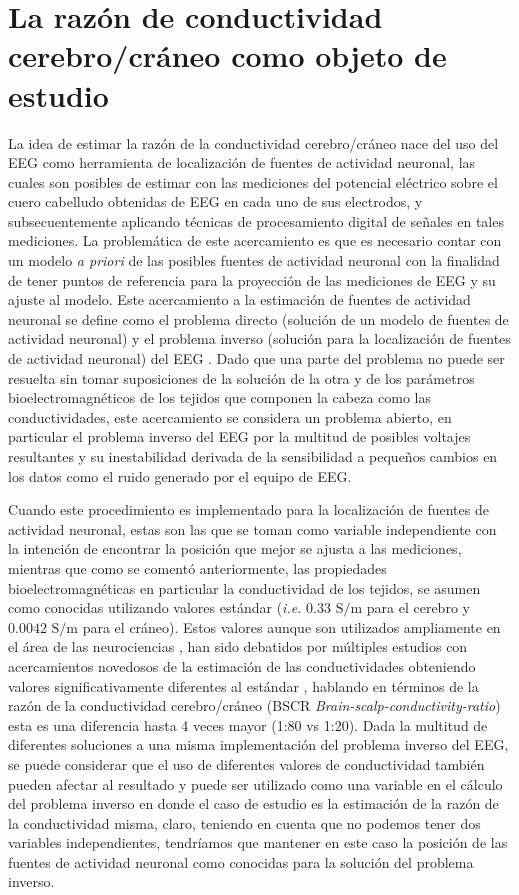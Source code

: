 \section{La razón de conductividad cerebro/cráneo como objeto de estudio}
\label{sec:intro:study}

La idea de estimar la razón de la conductividad cerebro/cráneo nace del uso del EEG como herramienta de localización de fuentes de actividad neuronal, las cuales son posibles de estimar con las mediciones del potencial eléctrico sobre el cuero cabelludo obtenidas de EEG en cada uno de sus electrodos, y subsecuentemente aplicando técnicas de procesamiento digital de señales en tales mediciones. La problemática de este acercamiento es que es necesario contar con un modelo \emph{a priori} de las posibles fuentes de actividad neuronal con la finalidad de tener puntos de referencia para la proyección de las mediciones de EEG y su ajuste al modelo. Este acercamiento a la estimación de fuentes de actividad neuronal se define como el problema directo (solución de un modelo de fuentes de actividad neuronal) y el problema inverso (solución para la localización de fuentes de actividad neuronal) del EEG \cite{Hallez2007}. Dado que una parte del problema no puede ser resuelta sin tomar suposiciones de la solución de la otra y de los parámetros bioelectromagnéticos de los tejidos que componen la cabeza como las conductividades, este acercamiento se considera un problema abierto, en particular el problema inverso del EEG por la multitud de posibles voltajes resultantes y su inestabilidad derivada de la sensibilidad a pequeños cambios en los datos como el ruido generado por el equipo de EEG. 

Cuando este procedimiento es implementado para la localización de fuentes de actividad neuronal, estas son las que se toman como variable independiente con la intención de encontrar la posición que mejor se ajusta a las mediciones, mientras que como se comentó anteriormente, las propiedades bioelectromagnéticas en particular la conductividad de los tejidos, se asumen como conocidas utilizando valores estándar (\emph{i.e.} $0.33\text{ S/m}$ para el cerebro y $0.0042 \text{ S/m}$ para el cráneo). Estos valores aunque son utilizados ampliamente en el área de las neurociencias \cite{Rush1968,Rush1969,Cohen1983}, han sido debatidos por múltiples estudios con acercamientos novedosos de la estimación de las conductividades obteniendo valores significativamente diferentes al estándar \cite{McCann2019}, hablando en términos de la razón de la conductividad cerebro/cráneo (BSCR \emph{Brain-scalp-conductivity-ratio}) esta es una diferencia hasta 4 veces mayor (1:80 vs 1:20). Dada la multitud de diferentes soluciones a una misma implementación del problema inverso del EEG, se puede considerar que el uso de diferentes valores de conductividad también pueden afectar al resultado y puede ser utilizado como una variable en el cálculo del problema inverso en donde el caso de estudio es la estimación de la razón de la conductividad misma, claro, teniendo en cuenta que no podemos tener dos variables independientes, tendríamos que mantener en este caso la posición de las fuentes de actividad neuronal como conocidas para la solución del problema inverso. 

